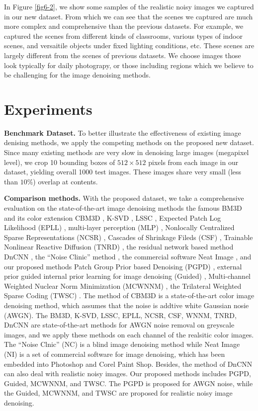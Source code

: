 In Figure \ref{fig6-2}, we show some samples of the realistic noisy images we captured in our new dataset. From which we can see that the scenes we captured are much more complex and comprehensive than the previous datasets. For example, we captured the scenes from different kinds of classrooms, various types of indoor scenes, and versaitile objects under fixed lighting conditions, etc. These scenes are largely different from the scenes of previous datasets. We choose images those look typically for daily photograpy, or those including regions which we believe to be challenging for the image denoising methods.



\section{Experiments}

\textbf{Benchmark Dataset.} To better illustrate the effectiveness of existing image denising methods, we apply the competing methods on the proposed new dataset. Since many existing methods are very slow in denoising large images (megapixel level), we crop 10 bounding boxes of $512\times512$ pixels from each image in our dataset, yielding overall 1000 test images. These images share very small (less than $10\%$) overlap at contents.

\textbf{Comparison methods.} With the proposed dataset, we take a comprehensive evaluation on the state-of-the-art image denoising methods the famous BM3D \cite{bm3d} and its color extension CBM3D \cite{cbm3d}, K-SVD \cite{ksvd}, LSSC \cite{lssc}, Expected Patch Log Likelihood (EPLL) \cite{epll}, multi-layer perception (MLP) \cite{mlp}, Nonlocally Centralized Sparse Representations (NCSR) \cite{ncsr}, Cascades of Shrinkage Fileds (CSF) \cite{csf}, Trainable Nonlinear Reactive Diffusion (TNRD) \cite{tnrd}, the residual network based method DnCNN \cite{dncnn}, the ``Noise Clinic'' method \cite{noiseclinic,ncwebsite}, the commercial software Neat Image \cite{neatimage}, and our proposed methods Patch Group Prior based Denoising (PGPD) \cite{pgpd}, external prior guided internal prior learning for image denoising (Guided) \cite{guided}, Multi-channel Weighted Nuclear Norm Minimization (MCWNNM) \cite{mcwnnm}, the Trilateral Weighted Sparse Coding (TWSC) \cite{twsc}. The method of CBM3D is a state-of-the-art color image denoising method, which assumes that the noise is addtive white Gaussian nosie (AWGN). The BM3D, K-SVD, LSSC, EPLL, NCSR, CSF, WNNM, TNRD, DnCNN are state-of-the-art methods for AWGN noise removal on greyscale images, and we apply these methods on each channel of the realsitic color images.  The ``Noise Clnic'' (NC) is a blind image denoising method while Neat Image (NI) is a set of commercial software for image denoising, which has been embedded into Photoshop and Corel Paint Shop. Besides, the method of DnCNN \cite{dncnn} can also deal with realistic noisy images. Our proposed methods includes PGPD, Guided, MCWNNM, and TWSC. The PGPD is proposed for AWGN noise, while the Guided, MCWNNM, and TWSC are proposed for realistic noisy image denoising.

